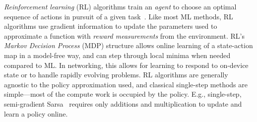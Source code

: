 \documentclass[
conference
,10pt
]{IEEEtran}
\newcommand{\acval}[3]{\ensuremath{\operatorname{\hat{q}}(#1, #2, #3)}}
\newcommand{\acvalblank}{\ensuremath{\operatorname{\hat{q}}(\cdot)}}
\newcommand{\wvec}[1]{\ensuremath{\bm{w}_{#1}}}
\begin{document}
\emph{Reinforcement learning} (RL) algorithms train an \emph{agent} to choose an optimal sequence of actions in pursuit of a given task~\parencite{RL2E}.
Like most ML methods, RL algorithms use gradient information to update the parameters used to approximate a function with \emph{reward measurements} from the environment.
RL's \emph{Markov Decision Process} (MDP) structure allows online learning of a state-action map in a model-free way, and can step through local minima when needed compared to ML.
In networking, this allows for learning to respond to on-device state or to handle rapidly evolving problems.
RL algorithms are generally agnostic to the policy approximation used, and classical single-step methods are simple---most of the compute work is occupied by the policy.
E.g., single-step, semi-gradient Sarsa~\parencite[pp. \numrange{217}{221}]{RL2E} requires only additions and multiplication to update and learn a policy online.

\end{document}
